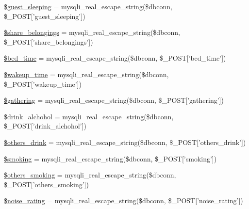 \begin{DoxyCompactItemize}
\item 
\hyperlink{user__view_2validate_2studentVal_8php_a30ca6680bf78675c5916e0c0114191fb}{\$guest\-\_\-sleeping} = mysqli\-\_\-real\-\_\-escape\-\_\-string(\$dbconn, \$\-\_\-\-P\-O\-S\-T\mbox{[}'guest\-\_\-sleeping'\mbox{]})
\item 
\hyperlink{user__view_2validate_2studentVal_8php_ad62de11903542434007800bf0bc24594}{\$share\-\_\-belongings} = mysqli\-\_\-real\-\_\-escape\-\_\-string(\$dbconn, \$\-\_\-\-P\-O\-S\-T\mbox{[}'share\-\_\-belongings'\mbox{]})
\item 
\hyperlink{user__view_2validate_2studentVal_8php_a08edd61848021bc8ed4c15804842d5fb}{\$bed\-\_\-time} = mysqli\-\_\-real\-\_\-escape\-\_\-string(\$dbconn, \$\-\_\-\-P\-O\-S\-T\mbox{[}'bed\-\_\-time'\mbox{]})
\item 
\hyperlink{user__view_2validate_2studentVal_8php_ade31df5f8971826d6902226d01975007}{\$wakeup\-\_\-time} = mysqli\-\_\-real\-\_\-escape\-\_\-string(\$dbconn, \$\-\_\-\-P\-O\-S\-T\mbox{[}'wakeup\-\_\-time'\mbox{]})
\item 
\hyperlink{user__view_2validate_2studentVal_8php_a0b341ac1da1798a6803878383a2a6086}{\$gathering} = mysqli\-\_\-real\-\_\-escape\-\_\-string(\$dbconn, \$\-\_\-\-P\-O\-S\-T\mbox{[}'gathering'\mbox{]})
\item 
\hyperlink{user__view_2validate_2studentVal_8php_a155e4a24650f8440d97423fe1d652eb7}{\$drink\-\_\-alchohol} = mysqli\-\_\-real\-\_\-escape\-\_\-string(\$dbconn, \$\-\_\-\-P\-O\-S\-T\mbox{[}'drink\-\_\-alchohol'\mbox{]})
\item 
\hyperlink{user__view_2validate_2studentVal_8php_ad8d98a0ffa836c8f5ff6cd94cc18dca1}{\$others\-\_\-drink} = mysqli\-\_\-real\-\_\-escape\-\_\-string(\$dbconn, \$\-\_\-\-P\-O\-S\-T\mbox{[}'others\-\_\-drink'\mbox{]})
\item 
\hyperlink{user__view_2validate_2studentVal_8php_a266c5c8c450a524f2b62297da83a6461}{\$smoking} = mysqli\-\_\-real\-\_\-escape\-\_\-string(\$dbconn, \$\-\_\-\-P\-O\-S\-T\mbox{[}'smoking'\mbox{]})
\item 
\hyperlink{user__view_2validate_2studentVal_8php_a41f287196869fc73324563f84fc1ea73}{\$others\-\_\-smoking} = mysqli\-\_\-real\-\_\-escape\-\_\-string(\$dbconn, \$\-\_\-\-P\-O\-S\-T\mbox{[}'others\-\_\-smoking'\mbox{]})
\item 
\hyperlink{user__view_2validate_2studentVal_8php_a92d14fe0154487caa69f117986fb08da}{\$noise\-\_\-rating} = mysqli\-\_\-real\-\_\-escape\-\_\-string(\$dbconn, \$\-\_\-\-P\-O\-S\-T\mbox{[}'noise\-\_\-rating'\mbox{]})
\item 

\end{DoxyCompactItemize}
